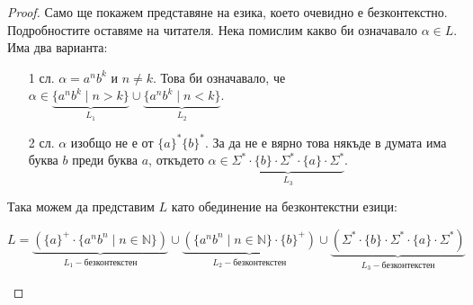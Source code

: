 \begin{proof}
    Само ще покажем представяне на езика, което очевидно е безконтекстно.
    Подробностите оставяме на читателя.
    Нека помислим какво би означавало $\alpha \in L$.
    Има два варианта:
    \begin{itemize}
        \item[1 сл.] $\alpha = a^nb^k$ и $n \neq k$.
            Това би означавало, че $\alpha \in \underbrace{\{ a^nb^k \mid n > k \}}_{L_1} \cup \underbrace{\{ a^nb^k \mid n < k \}}_{L_2}$.
        \item[2 сл.] $\alpha$ изобщо не е от $\{ a \}^* \{ b \}^*$.
            За да не е вярно това някъде в думата има буква $b$ преди буква $a$, откъдето $\alpha \in \underbrace{\Sigma^* \cdot \{ b \} \cdot \Sigma^* \cdot \{ a \} \cdot \Sigma^*}_{L_3}$.
    \end{itemize}
    Така можем да представим $L$ като обединение на безконтекстни езици:
    \begin{center}
        $L = \underbrace{(\{ a \}^+ \cdot \{ a^nb^n \mid n \in \mathbb{N} \})}_{L_1 - \text{безконтекстен}} \cup \underbrace{(\{ a^nb^n \mid n \in \mathbb{N} \} \cdot \{ b \}^+)}_{L_2 - \text{безконтекстен}} \cup \underbrace{(\Sigma^* \cdot \{ b \} \cdot \Sigma^* \cdot \{ a \} \cdot \Sigma^*)}_{L_3 - \text{безконтекстен}}$
    \end{center}
\end{proof}